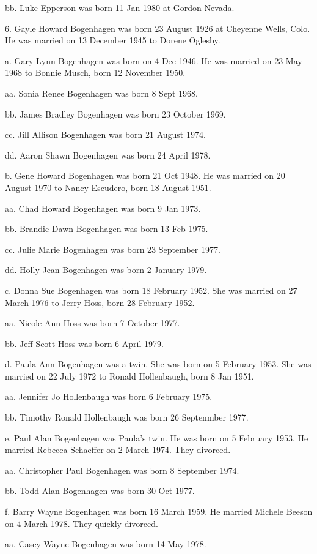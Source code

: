 \documentclass[a4paper]{article}
\begin{document}
bb. Luke Epperson was born 11 Jan 1980 at Gordon Nevada.

6. Gayle Howard Bogenhagen was born 23 August 1926 at Cheyenne Wells, Colo.  He was married on 13 December 1945 to Dorene Oglesby. 

a. Gary Lynn Bogenhagen was born on 4 Dec 1946. He was married on  23 May 1968 to Bonnie Musch, born 12 November 1950. 

aa. Sonia Renee Bogenhagen was born 8 Sept 1968.

bb. James Bradley Bogenhagen was born 23 October 1969. 

cc. Jill Allison Bogenhagen was born 21 August 1974.

dd. Aaron Shawn Bogenhagen was born 24 April 1978.
			
b. Gene Howard Bogenhagen was born 21 Oct 1948.  He was married on 20 August 1970 to Nancy Escudero, born 18 August 1951.

aa. Chad Howard Bogenhagen was born 9 Jan 1973.

bb. Brandie Dawn Bogenhagen was born 13 Feb 1975.

cc. Julie Marie Bogenhagen was born 23 September 1977.

dd. Holly Jean Bogenhagen was born 2 January 1979.

c. Donna Sue Bogenhagen was born 18 February 1952.  She was married on 27 March 1976 to Jerry Hoss, born 28 February 1952.

aa. Nicole Ann Hoss was born 7 October 1977.

bb. Jeff Scott Hoss was born 6 April 1979.

d. Paula Ann Bogenhagen was a twin.  She was born on 5 February 1953. She was married on 22 July 1972 to Ronald Hollenbaugh, born 8 Jan 1951.

aa. Jennifer Jo Hollenbaugh was born 6 February 1975.

bb. Timothy Ronald Hollenbaugh was born 26 Septenmber 1977.
		
e. Paul Alan Bogenhagen was Paula's twin.  He was born on 5 February 1953.  He married Rebecca Schaeffer on 2 March 1974.  They divorced.

aa. Christopher Paul Bogenhagen was born 8 September 1974.

bb. Todd Alan Bogenhagen was born 30 Oct 1977.

f. Barry Wayne Bogenhagen was born 16 March 1959.  He married Michele Beeson on 4 March 1978.  They quickly divorced.

aa. Casey Wayne Bogenhagen was born 14 May 1978.
\end{document}
